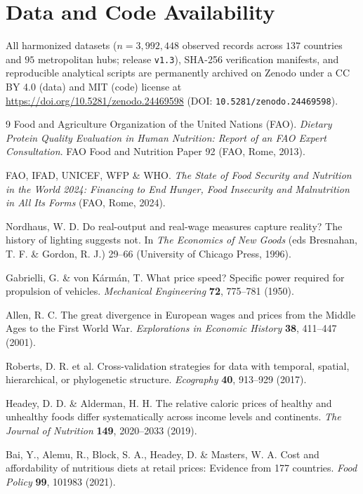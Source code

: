 \documentclass[11pt,a4paper]{article}
\begin{document}
\section*{Data and Code Availability}
All harmonized datasets ($n = 3{,}992{,}448$ observed records across $137$ countries and $95$ metropolitan hubs; release \texttt{v1.3}), SHA-256 verification manifests, and reproducible analytical scripts are permanently archived on Zenodo under a CC BY 4.0 (data) and MIT (code) license at \url{https://doi.org/10.5281/zenodo.24469598} (DOI: \texttt{10.5281/zenodo.24469598}).

\begin{thebibliography}{9}
Food and Agriculture Organization of the United Nations (FAO). \textit{Dietary Protein Quality Evaluation in Human Nutrition: Report of an FAO Expert Consultation}. FAO Food and Nutrition Paper 92 (FAO, Rome, 2013).

FAO, IFAD, UNICEF, WFP \& WHO. \textit{The State of Food Security and Nutrition in the World 2024: Financing to End Hunger, Food Insecurity and Malnutrition in All Its Forms} (FAO, Rome, 2024).

Nordhaus, W. D. Do real-output and real-wage measures capture reality? The history of lighting suggests not. In \textit{The Economics of New Goods} (eds Bresnahan, T. F. \& Gordon, R. J.) 29--66 (University of Chicago Press, 1996).

Gabrielli, G. \& von K\'arm\'an, T. What price speed? Specific power required for propulsion of vehicles. \textit{Mechanical Engineering} \textbf{72}, 775--781 (1950).

Allen, R. C. The great divergence in European wages and prices from the Middle Ages to the First World War. \textit{Explorations in Economic History} \textbf{38}, 411--447 (2001).

Roberts, D. R. et al. Cross-validation strategies for data with temporal, spatial, hierarchical, or phylogenetic structure. \textit{Ecography} \textbf{40}, 913--929 (2017).

Headey, D. D. \& Alderman, H. H. The relative caloric prices of healthy and unhealthy foods differ systematically across income levels and continents. \textit{The Journal of Nutrition} \textbf{149}, 2020--2033 (2019).

Bai, Y., Alemu, R., Block, S. A., Headey, D. \& Masters, W. A. Cost and affordability of nutritious diets at retail prices: Evidence from 177 countries. \textit{Food Policy} \textbf{99}, 101983 (2021).
\end{thebibliography}
\end{document}
